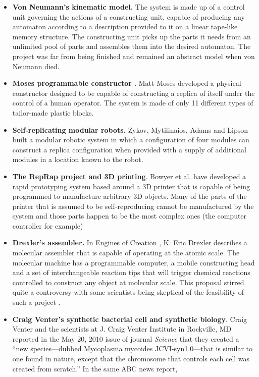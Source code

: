 \begin{itemize}
\item \textbf{Von Neumann’s kinematic model.} The system is made up of a
control unit governing the actions of a constructing unit, capable of
producing any automaton according to a description provided to it on a
linear tape-like memory structure. The constructing unit picks up the
parts it needs from an unlimited pool of parts and assembles them into
the desired automaton. The project was far from being finished and
remained an abstract model when von Neumann died.
\item \textbf{Moses{\textquotesingle} programmable constructor
}\textbf{.} Matt Moses developed a physical constructor designed to be
capable of constructing a replica of itself under the control of a
human operator. The system is made of only 11 different types of
tailor-made plastic blocks.
\item \textbf{Self-replicating modular robots.} Zykov, Mytilinaios,
Adams and Lipson built a modular robotic system in which a
configuration of four modules can construct a replica configuration
when provided with a supply of additional modules in a location known
to the robot.
\item \textbf{The RepRap project and 3D printing}. Bowyer et al.  have
developed a rapid prototyping system based around a 3D printer that is
capable of being programmed to manufacture arbitrary 3D objects. Many
of the parts of the printer that is assumed to be self-reproducing
cannot be manufactured by the system and those parts happen to be the
most complex ones (the computer controller for example)
\item \textbf{Drexler’s assembler.} In Engines of Creation , K. Eric
Drexler describes a molecular assembler that is capable of operating at
the atomic scale. The molecular machine has a programmable computer, a
mobile constructing head and a set of interchangeable reaction tips
that will trigger chemical reactions controlled to construct any object
at molecular scale. This proposal stirred quite a controversy with some
scientists being skeptical of the feasibility of such a project . 
\item \textbf{Craig Venter’s synthetic bacterial cell and synthetic
biology}. Craig Venter and the scientists at
J. Craig Venter Institute in Rockville, MD
reported in the May 20, 2010 issue of journal
\textit{Science}
that they created a “new species---dubbed Mycoplasma mycoides
JCVI-syn1.0---that is similar to one found in nature, except that the
chromosome that controls each cell was created from scratch.” In the same ABC news report,

\end{itemize}
